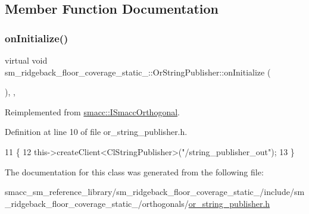 \subsection{Member Function Documentation}
\mbox{\label{classsm__ridgeback__floor__coverage__static__1_1_1OrStringPublisher_acf3ba60692bf9626ea438efde03c266d}} 
\subsubsection{\texorpdfstring{on\+Initialize()}{onInitialize()}}
{\footnotesize\ttfamily virtual void sm\+\_\+ridgeback\+\_\+floor\+\_\+coverage\+\_\+static\+\_\+::\+Or\+String\+Publisher\+::on\+Initialize (\begin{DoxyParamCaption}{ }\end{DoxyParamCaption})\hspace{0.3cm}{\ttfamily [inline]}, {\ttfamily [override]}, {\ttfamily [virtual]}}



Reimplemented from \hyperlink{classsmacc_1_1ISmaccOrthogonal_a6bb31c620cb64dd7b8417f8705c79c7a}{smacc\+::\+I\+Smacc\+Orthogonal}.



Definition at line 10 of file or\+\_\+string\+\_\+publisher.\+h.


\begin{DoxyCode}
11     \{
12         this->createClient<ClStringPublisher>(\textcolor{stringliteral}{"/string\_publisher\_out"});
13     \}
\end{DoxyCode}


The documentation for this class was generated from the following file\+:\begin{DoxyCompactItemize}
\item 
smacc\+\_\+sm\+\_\+reference\+\_\+library/sm\+\_\+ridgeback\+\_\+floor\+\_\+coverage\+\_\+static\+\_/include/sm\+\_\+ridgeback\+\_\+floor\+\_\+coverage\+\_\+static\+\_/orthogonals/\hyperlink{sm__ridgeback__floor__coverage__static__1_2include_2sm__ridgeback__floor__coverage__static__1_2o304626c32f63c4d7e2b526745e76188c}{or\+\_\+string\+\_\+publisher.\+h}\end{DoxyCompactItemize}
